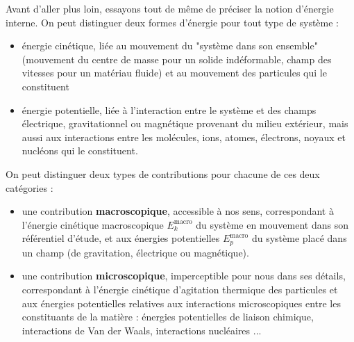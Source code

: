 \documentclass[11pt,a4paper]{report}
\begin{document}
Avant d'aller plus loin, essayons tout de même de préciser la notion d'énergie interne. On peut distinguer deux formes d'énergie pour tout type de système :
\begin{itemize}
	\item énergie cinétique, liée au mouvement du "système dans son ensemble" (mouvement du centre de masse pour un solide indéformable, champ des vitesses pour un matériau fluide) et au mouvement des particules qui le constituent
	\item énergie potentielle, liée à l'interaction entre le système et des champs électrique, gravitationnel ou magnétique provenant du milieu extérieur, mais aussi aux interactions entre les molécules, ions, atomes, électrons, noyaux et nucléons qui le constituent.
\end{itemize}
On peut distinguer deux types de contributions pour chacune de ces deux catégories :
\begin{itemize}
	\item une contribution \textbf{macroscopique}, accessible à nos sens, correspondant à l'énergie cinétique macroscopique $E_{k}^{\text{macro}}$ du système en mouvement dans son référentiel d'étude, et aux énergies potentielles $E_{p}^{\text{macro}}$ du système placé dans un champ (de gravitation, électrique ou magnétique).
	\item une contribution \textbf{microscopique}, imperceptible pour nous dans ses détails, correspondant à l'énergie cinétique d'agitation thermique des particules et aux énergies potentielles relatives aux interactions microscopiques entre les constituants de la matière : énergies potentielles de liaison chimique, interactions de Van der Waals, interactions nucléaires ...\\
\end{itemize}
\end{document}
